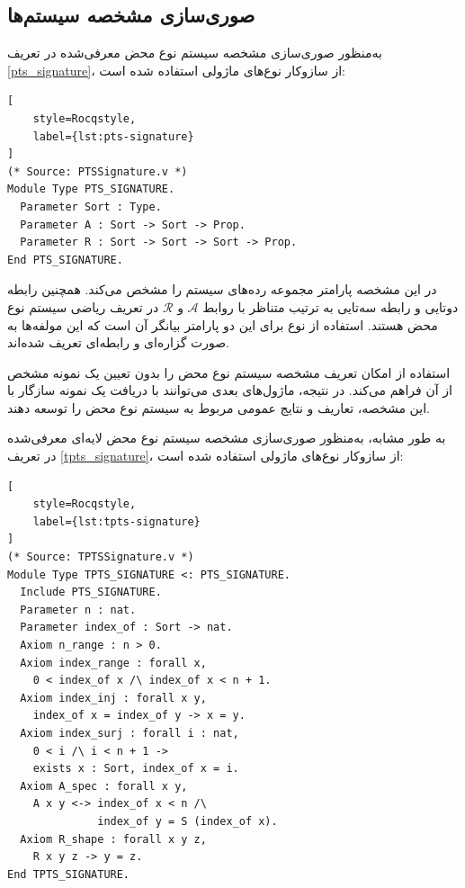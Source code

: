 \documentclass[11pt,twocolumn,a4paper,twoside]{article}
\theoremstyle{definition}
\theoremstyle{theorem}
\theoremstyle{definition}
\theoremstyle{definition}
\theoremstyle{definition}
\theoremstyle{definition}
\theoremstyle{definition}
\newcommand{\varname}[1]{\lr{\texttt{\footnotesize\detokenize{#1}}}}
\begin{document}
\subsection{صوری‌سازی مشخصه سیستم‌ها}

به‌منظور صوری‌سازی مشخصه سیستم نوع محض معرفی‌شده در تعریف \ref{pts_signature}، از سازوکار نوع‌های ماژولی استفاده شده است:

\begin{latin}
\begin{lstlisting}[
    style=Rocqstyle,
    label={lst:pts-signature}
]
(* Source: PTSSignature.v *)
Module Type PTS_SIGNATURE.
  Parameter Sort : Type.
  Parameter A : Sort -> Sort -> Prop.
  Parameter R : Sort -> Sort -> Sort -> Prop.
End PTS_SIGNATURE.
\end{lstlisting}
\end{latin}

در این مشخصه پارامتر \varname{Sort} مجموعه رده‌های سیستم را مشخص می‌کند. همچنین رابطه دوتایی \varname{A} و رابطه سه‌تایی \varname{R} به ترتیب متناظر با روابط $\mathcal{A}$ و $\mathcal{R}$ در تعریف ریاضی سیستم نوع محض هستند. استفاده از نوع \varname{Prop} برای این دو پارامتر بیانگر آن است که این مولفه‌ها به صورت گزاره‌ای و رابطه‌ای تعریف شده‌اند.

استفاده از \varname{Module Type} امکان تعریف مشخصه سیستم نوع محض را بدون تعیین یک نمونه مشخص از آن فراهم می‌کند. در نتیجه، ماژول‌های بعدی می‌توانند با دریافت یک نمونه سازگار با این مشخصه، تعاریف و نتایج عمومی مربوط به سیستم نوع محض را توسعه دهند.

به طور مشابه، به‌منظور صوری‌سازی مشخصه سیستم نوع محض لایه‌ای معرفی‌شده در تعریف \ref{tpts_signature}، از سازوکار نوع‌های ماژولی استفاده شده است:

\begin{latin}
\begin{lstlisting}[
    style=Rocqstyle,
    label={lst:tpts-signature}
]
(* Source: TPTSSignature.v *)
Module Type TPTS_SIGNATURE <: PTS_SIGNATURE.
  Include PTS_SIGNATURE.
  Parameter n : nat.
  Parameter index_of : Sort -> nat.
  Axiom n_range : n > 0.
  Axiom index_range : forall x, 
    0 < index_of x /\ index_of x < n + 1.
  Axiom index_inj : forall x y, 
    index_of x = index_of y -> x = y.
  Axiom index_surj : forall i : nat, 
    0 < i /\ i < n + 1 -> 
    exists x : Sort, index_of x = i.
  Axiom A_spec : forall x y, 
    A x y <-> index_of x < n /\ 
              index_of y = S (index_of x).
  Axiom R_shape : forall x y z, 
    R x y z -> y = z.
End TPTS_SIGNATURE.
\end{lstlisting}
\end{latin}
\end{document}
